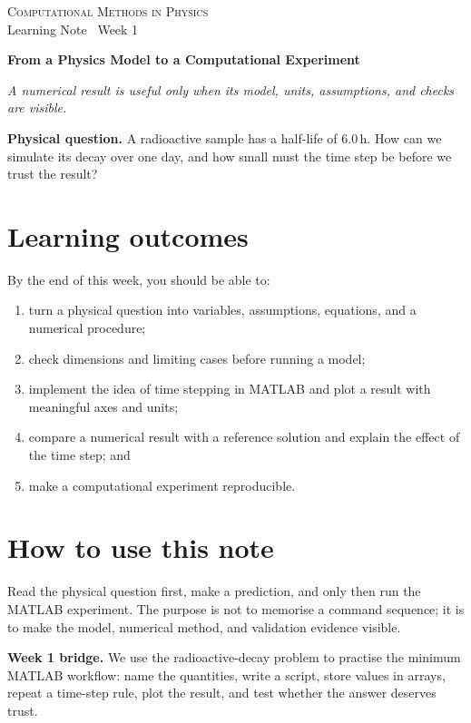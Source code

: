 \documentclass[11pt,a4paper]{article}
\newcommand{\course}{Computational Methods in Physics}
\begin{document}
{\large\textsc{\course}}\\[-2pt]
{\small Learning Note \textbar\ Week 1}\par\vspace{4pt}
{\LARGE\bfseries From a Physics Model to a Computational Experiment}\par\vspace{3pt}
\textit{A numerical result is useful only when its model, units, assumptions, and checks are visible.}

\begin{keybox}
\textbf{Physical question.} A radioactive sample has a half-life of $6.0\,\mathrm{h}$. How can we simulate its decay over one day, and how small must the time step be before we trust the result?
\end{keybox}

\section*{Learning outcomes}
By the end of this week, you should be able to:
\begin{enumerate}[nosep,leftmargin=5mm]
  \item turn a physical question into variables, assumptions, equations, and a numerical procedure;
  \item check dimensions and limiting cases before running a model;
  \item implement the idea of time stepping in MATLAB and plot a result with meaningful axes and units;
  \item compare a numerical result with a reference solution and explain the effect of the time step; and
  \item make a computational experiment reproducible.
\end{enumerate}

\section*{How to use this note}
Read the physical question first, make a prediction, and only then run the MATLAB experiment. The purpose is not to memorise a command sequence; it is to make the model, numerical method, and validation evidence visible.

\begin{keybox}
\textbf{Week 1 bridge.} We use the radioactive-decay problem to practise the minimum MATLAB workflow: name the quantities, write a script, store values in arrays, repeat a time-step rule, plot the result, and test whether the answer deserves trust.
\end{keybox}
\end{document}
